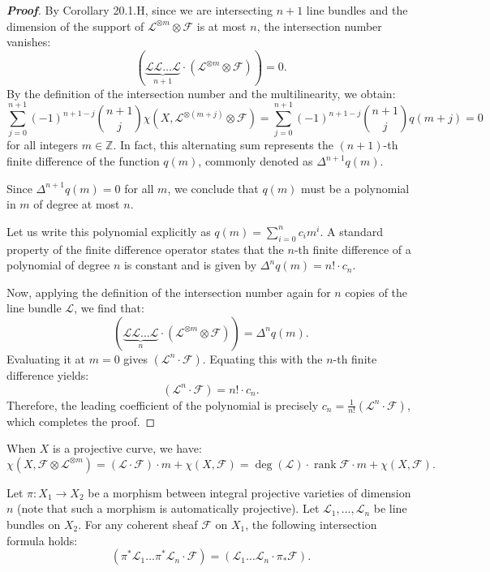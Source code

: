 \begin{proof}[\textbf{Proof}]
By Corollary 20.1.H, since we are intersecting $n+1$ line bundles and the dimension of the support of $\mathcal{L}^{\otimes m} \otimes \mathcal{F}$ is at most $n$, the intersection number vanishes:
\[
(\underbrace{\mathcal{L} \mathcal{L} \dots \mathcal{L}}_{n+1} \cdot (\mathcal{L}^{\otimes m} \otimes \mathcal{F})) = 0.
\]
By the definition of the intersection number and the multilinearity, we obtain:
\[
\sum_{j=0}^{n+1} (-1)^{n+1-j} \binom{n+1}{j} \chi(X, \mathcal{L}^{\otimes (m+j)} \otimes \mathcal{F}) = \sum_{j=0}^{n+1} (-1)^{n+1-j} \binom{n+1}{j} q(m+j) = 0
\]
for all integers $m \in \mathbb{Z}$. In fact, this alternating sum represents the $(n+1)$-th finite difference of the function $q(m)$, commonly denoted as $\Delta^{n+1} q(m)$. 

Since $\Delta^{n+1} q(m) = 0$ for all $m$, we conclude that $q(m)$ must be a polynomial in $m$ of degree at most $n$.

Let us write this polynomial explicitly as $q(m) = \sum_{i=0}^n c_i m^i$. A standard property of the finite difference operator states that the $n$-th finite difference of a polynomial of degree $n$ is constant and is given by $\Delta^n q(m) = n! \cdot c_n$.

Now, applying the definition of the intersection number again for $n$ copies of the line bundle $\mathcal{L}$, we find that:
\[
(\underbrace{\mathcal{L} \mathcal{L} \dots \mathcal{L}}_n \cdot (\mathcal{L}^{\otimes m} \otimes \mathcal{F})) = \Delta^n q(m).
\]
Evaluating it at $m=0$ gives $(\mathcal{L}^n \cdot \mathcal{F})$. Equating this with the $n$-th finite difference yields:
\[
(\mathcal{L}^n \cdot \mathcal{F}) = n! \cdot c_n.
\]
Therefore, the leading coefficient of the polynomial is precisely $c_n = \frac{1}{n!} (\mathcal{L}^n \cdot \mathcal{F})$, which completes the proof.
\end{proof}

\begin{corollary}
    When $X$ is a projective curve, we have:
    \[
    \chi(X,\mathcal{F}\otimes\mathcal{L}^{\otimes m}) = (\mathcal{L}\cdot\mathcal{F}) \cdot m + \chi(X, \mathcal{F}) = \deg(\mathcal{L})\cdot\operatorname{rank}\mathcal{F} \cdot m + \chi(X, \mathcal{F}).
    \]
\end{corollary}

\begin{theorem}
Let $\pi: X_1 \longrightarrow X_2$ be a morphism between integral projective varieties of dimension $n$ (note that such a morphism is automatically projective). 
Let $\mathcal{L}_1, \dots, \mathcal{L}_n$ be line bundles on $X_2$. 
For any coherent sheaf $\mathcal{F}$ on $X_1$, the following intersection formula holds:
\[
(\pi^*\mathcal{L}_1 \dots \pi^*\mathcal{L}_n \cdot \mathcal{F}) = (\mathcal{L}_1 \dots \mathcal{L}_n \cdot \pi_*\mathcal{F}).
\]
\end{theorem}

